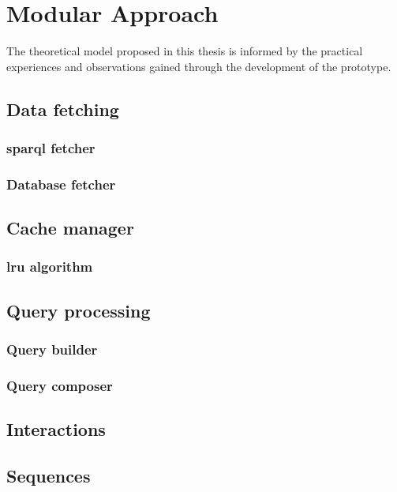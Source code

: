 \chapter{Modular Approach} \label{ch:modularApproach}
The theoretical model proposed in this thesis is informed by the practical experiences and observations gained through the development of the prototype.

\section{Data fetching}

\subsection{\acs{sparql} fetcher}

\subsection{Database fetcher}

\section{Cache manager}

\subsection{\acs{lru} algorithm}

\section{Query processing}

\subsection{Query builder}

\subsection{Query composer}

\section{Interactions} \label{sec:interactions}

\section{Sequences}
